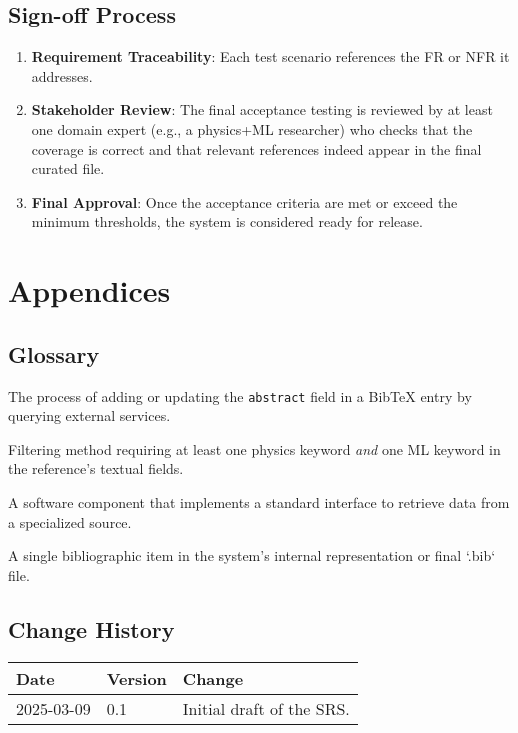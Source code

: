 \documentclass[12pt]{article}
\begin{document}
\subsection{Sign-off Process}
\begin{enumerate}
  \item \textbf{Requirement Traceability}: Each test scenario references the FR or NFR it addresses. 
  \item \textbf{Stakeholder Review}: The final acceptance testing is reviewed by at least one domain expert (e.g., a physics+ML researcher) who checks that the coverage is correct and that relevant references indeed appear in the final curated file.
  \item \textbf{Final Approval}: Once the acceptance criteria are met or exceed the minimum thresholds, the system is considered ready for release.
\end{enumerate}

\newpage

\section{Appendices}

\subsection{Glossary}
\begin{description}[style=nextline]
  \item[Abstract Augmentation] The process of adding or updating the \texttt{abstract} field in a BibTeX entry by querying external services.
  \item[Lexicon Intersection] Filtering method requiring at least one physics keyword \emph{and} one ML keyword in the reference’s textual fields.
  \item[Plugin / Scraper] A software component that implements a standard interface to retrieve data from a specialized source.
  \item[Reference] A single bibliographic item in the system’s internal representation or final `.bib` file.
\end{description}

\subsection{Change History}
\begin{tabular}{|l|l|p{7cm}|}
\hline
\textbf{Date} & \textbf{Version} & \textbf{Change}\\
\hline
2025-03-09 & 0.1 & Initial draft of the SRS. \\
\hline
\end{tabular}
\end{document}
